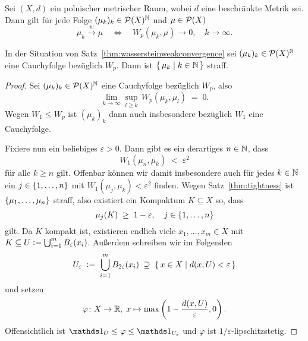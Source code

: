 \documentclass[../main/main.tex]{subfiles}
\begin{document}
	\begin{Satz}
		\label{thm:wassersteinweakconvergence}
		Sei $(X, d)$ ein polnischer metrischer Raum, wobei $d$ eine beschränkte Metrik sei. Dann gilt
		für jede Folge $(\mu_k)_k \in \mathcal{P}(X)^{\mathbb{N}}$ und $\mu \in \mathcal{P}(X)$
		\[ \mu_k \xrightarrow{w} \mu \quad \iff \quad W_p(\mu_k, \mu) \to 0, \quad k \to \infty \text{.} \]
	\end{Satz}

	\begin{Hilfssatz}
		\label{lem:wassersteincauchyseq}
		In der Situation von Satz~\ref{thm:wassersteinweakconvergence} sei $(\mu_k)_k \in \mathcal{P}(X)^{\mathbb{N}}$ eine Cauchyfolge
		bezüglich $W_p$. Dann ist $\left\{\, \mu_k \; \middle| \; k \in \mathbb{N} \,\right\}$ straff.
	\end{Hilfssatz}

	\begin{proof}
		Sei $(\mu_k)_k \in \mathcal{P}(X)^{\mathbb{N}}$ eine Cauchyfolge bezüglich $W_p$, also
		\[ \lim_{k \to \infty} \sup_{l \geq k} \, W_p(\mu_k, \mu_l) \; = \; 0 \text{.} \]
		Wegen $W_1 \leq W_p$ ist $(\mu_k)_k$ dann auch insbesondere bezüglich $W_1$ eine Cauchyfolge. 
		
		Fixiere nun ein beliebiges $\varepsilon > 0$. Dann gibt es ein derartiges $n \in \mathbb{N}$, dass 
		\[ W_1(\mu_n, \mu_k) \; < \; \varepsilon^2 \]
		für alle $k \geq n$ gilt. Offenbar können wir damit insbesondere auch für jedes $k \in \mathbb{N}$ ein $j \in \left\{1, \dots, n\right\}$ mit
		$W_1(\mu_j, \mu_k) < \varepsilon^2$ finden. Wegen Satz~\ref{thm:tightness} ist $\left\{\mu_1, \dots, \mu_n\right\}$ straff, also existiert ein Kompaktum
		$K \subseteq X$ so, dass
		\[ \mu_j(K) \; \geq \; 1 - \varepsilon, \quad j \in \left\{1, \dots, n\right\} \]
		gilt. Da $K$ kompakt ist, existieren endlich viele $x_1, \dots, x_m \in X$ mit 
		$K \subseteq U \vcentcolon = \bigcup_{i=1}^{m} B_{\varepsilon}(x_i)$.
		Außerdem schreiben wir im Folgenden 
		\[ U_{\varepsilon} \; \vcentcolon = \; \bigcup_{i=1}^{m} B_{2\varepsilon}(x_i) \; \supseteq \; \left\{\, x \in X \; \middle| \; d(x, U) < \varepsilon \,\right\} \] 
		und setzen 
		\[ \varphi \colon X \to \mathbb{R}, \; x \mapsto \max \left( 1-\frac{d(x, U)}{\varepsilon}, 0 \right)  \text{.} \]
		Offensichtlich ist $\indfct_U \leq \varphi \leq \indfct_{U_\varepsilon}$ und $\varphi$ ist $1/\varepsilon$-lipschitzstetig.
		

\end{proof}
\end{document}
